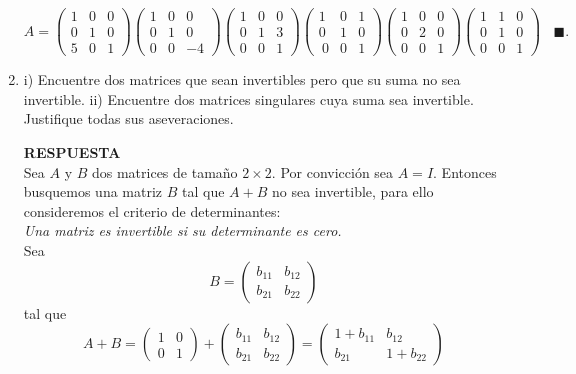 \documentclass[11pt,letterpaper]{article}
\newcommand{\res}{\textbf{RESPUESTA}\\}
\newcommand{\finf}{\blacksquare.}
\begin{document}
\begin{enumerate}
\begin{equation*}
A=\begin{pmatrix}
 1 & 0 & 0\\
 0 & 1 & 0\\
 5 & 0 & 1
\end{pmatrix}
\begin{pmatrix}
 1 & 0 & 0\\
 0 & 1 & 0\\
 0 & 0 & -4
\end{pmatrix}
\begin{pmatrix}
 1 & 0 & 0\\
 0 & 1 & 3\\
 0 & 0 & 1
\end{pmatrix}
\begin{pmatrix}
 1 & 0 & 1\\
 0 & 1 & 0\\\
 0 & 0 & 1
\end{pmatrix}
\begin{pmatrix}
 1 & 0 & 0\\
 0 & 2 & 0\\
 0 & 0 & 1
\end{pmatrix}
\begin{pmatrix}
 1 & 1 & 0\\
 0 & 1 & 0\\
 0 & 0 & 1
\end{pmatrix}\ \ \ \ \finf
\end{equation*}
\item i) Encuentre dos matrices que sean invertibles pero que su suma no sea invertible. ii) Encuentre dos matrices singulares cuya suma sea invertible. Justifique todas sus aseveraciones.

\res
Sea $A$ y $B$ dos matrices de tamaño $2\times 2$. Por convicción sea $A=I$. Entonces busquemos una matriz $B$ tal que $A+B$ no sea invertible, para ello consideremos el criterio de determinantes:\\

\textit{Una matriz es invertible si su determinante es cero.}\\
Sea 
$$B=\begin{pmatrix}
b_{11} & b_{12}\\
b_{21} & b_{22}
\end{pmatrix}$$ tal que
$$A+B=\begin{pmatrix}
1 & 0\\
0 & 1
\end{pmatrix}+\begin{pmatrix}
b_{11} & b_{12}\\
b_{21} & b_{22}
\end{pmatrix}=\begin{pmatrix}
1+b_{11} & b_{12}\\
b_{21} & 1+b_{22}
\end{pmatrix}$$


\end{enumerate}
\end{document}

